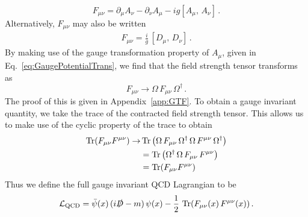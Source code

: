 %
\begin{equation}
F_{\mu\nu}=\partial_\mu A_\nu - \partial_\nu A_\mu - ig[A_\mu,\,A_\nu]\, .
\label{eq:FieldStrengthTensor}
\end{equation}
%
Alternatively, $F_{\mu\nu}$ may also be written
%
\begin{align}
F_{\mu\nu} = \frac{i}{g}\,[D_\mu,\, D_\nu]\, .
\end{align}
%
By making use of the gauge transformation property of $A_\mu$, given in Eq.~\ref{eq:GaugePotentialTrans}, we find that the field strength tensor transforms as
%
\begin{equation}
F_{\mu\nu}\rightarrow \Omega\,F_{\mu\nu}\, \Omega^\dagger\, .
\end{equation}
%
The proof of this is given in Appendix~\ref{app:GTF}. To obtain a gauge invariant quantity, we take the trace of the contracted field strength tensor. This allows us to make use of the cyclic property of the trace to obtain
%
\begin{align*}
\operatorname{Tr}(F_{\mu\nu}F^{\mu\nu})\rightarrow &\operatorname{Tr}\left(\Omega\,F_{\mu\nu}\, \Omega^\dagger\,\Omega\,F^{\mu\nu}\, \Omega^\dagger\right)\\
&=\operatorname{Tr}\left(\Omega^\dagger \, \Omega\,F_{\mu\nu}\,F^{\mu\nu}\right)\\
&=\operatorname{Tr}(F_{\mu\nu}F^{\mu\nu})
\end{align*}
Thus we define the full gauge invariant QCD Lagrangian to be
%
\begin{equation}
\mathcal{L_{\text{QCD}}}=\bar{\psi}(x)\,(i\slashed{D}-m)\,\psi(x)-\frac{1}{2}\,\operatorname{Tr}(F_{\mu\nu}(x)\,F^{\mu\nu}(x))\, .
\label{eq:QCDLagrangian}
\end{equation}\\

